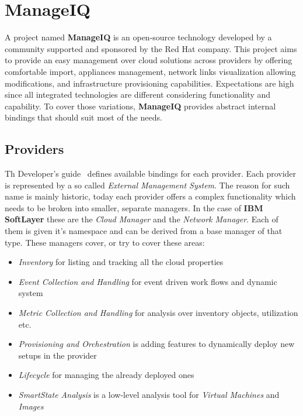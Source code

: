 \chapter{ManageIQ}
\label{chap:ManageIQ}

A project named \textbf{ManageIQ} is an open-source technology developed by a community supported and sponsored by the Red Hat company. This project aims to provide an easy management over cloud solutions across providers by offering comfortable import, appliances management, network links visualization allowing modifications, and infrastructure provisioning capabilities. Expectations are high since all integrated technologies are different considering functionality and capability. To cover those variations, \textbf{ManageIQ} provides abstract internal bindings that should suit most of the needs.

\section{Providers}
\label{sec:Providers}

Th Developer's guide~\cite{manageiq_dev} defines available bindings for each provider. Each provider is represented by a so called \emph{External Management System}. The reason for such name is mainly historic, today each provider offers a complex functionality which needs to be broken into smaller, separate managers. In the case of \textbf{IBM SoftLayer} these are the \emph{Cloud Manager} and the \emph{Network Manager}. Each of them is given it's namespace and can be derived from a base manager of that type. These managers cover, or try to cover these areas:

\begin{itemize}
	\item \emph{Inventory} for listing and tracking all the cloud properties
	\item \emph{Event Collection and Handling} for event driven work flows and dynamic system
	\item \emph{Metric Collection and Handling} for analysis over inventory objects, utilization etc.
	\item \emph{Provisioning and Orchestration} is adding features to dynamically deploy new setups in the provider
	\item \emph{Lifecycle} for managing the already deployed ones
	\item \emph{SmartState Analysis} is a low-level analysis tool for \emph{Virtual Machines} and \emph{Images}
\end{itemize}

